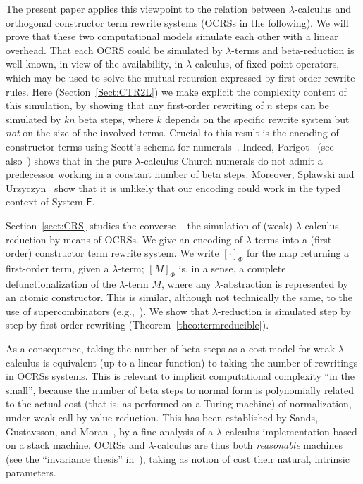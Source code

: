 \documentclass{LMCS}
\newcommand{\LambdatoTRS}[1]{[#1]_{\Phi}}
\newcounter{number}
\begin{document}
The present paper applies this viewpoint to the relation between $\lambda$-calculus and orthogonal constructor 
term rewrite systems (OCRSs in the following). We will prove that these two computational
models simulate each other with a linear overhead. That each OCRS
could be simulated by $\lambda$-terms and beta-reduction is
well known, in view of the availability, in $\lambda$-calculus, of
fixed-point operators, which may be used to solve the mutual recursion expressed by 
first-order rewrite rules. 
Here (Section~\ref{Sect:CTR2L})
we make explicit the complexity content of this simulation, by showing that
any first-order rewriting of $n$ steps can be simulated by $kn$ beta steps, where
$k$ depends on the specific rewrite system but \emph{not} on the size of the involved terms.
Crucial to this result is the encoding of constructor terms using Scott's schema for numerals~\cite{Wadsworth80}.
Indeed, Parigot~\cite{Parigot89CSL} (see also~\cite{ParigotRoziere93}) shows that in the pure $\lambda$-calculus
Church numerals do not admit a predecessor working in a constant number of beta steps.
Moreover, Splawski and Urzyczyn~\cite{SplawskiU99} show that it is unlikely that our encoding 
could work in the typed context of System $\mathsf{F}$.

Section~\ref{sect:CRS} studies the converse -- the simulation of (weak) $\lambda$-calculus reduction by means of
OCRSs. We give an encoding of $\lambda$-terms into a (first-order) constructor term rewrite 
system. We write   $\LambdatoTRS{\cdot}$ for the map returning a first-order term, given a $\lambda$-term; 
$\LambdatoTRS{M}$ is, in a sense, a complete defunctionalization of the $\lambda$-term $M$, 
where any $\lambda$-abstraction is represented by an atomic constructor. This is similar, 
although not technically the same, to the use of supercombinators (e.g.,~\cite{PJ87}).
We show that $\lambda$-reduction is simulated step by step by first-order rewriting 
(Theorem~\ref{theo:termreducible}).

As a consequence, taking the number of beta steps as a cost model for weak $\lambda$-calculus
is equivalent (up to a linear function) to taking the number of rewritings in OCRSs
systems. This is relevant to implicit computational complexity ``in the small'', because
the number of beta steps to normal form is polynomially related to the
actual cost (that is, as performed on a Turing machine) of normalization,
under weak call-by-value reduction. This has been established by 
Sands, Gustavsson, and Moran~\cite{Sands:Lambda02}, by a fine analysis of a $\lambda$-calculus implementation based on
a stack machine. OCRSs and $\lambda$-calculus
are thus both \emph{reasonable} machines (see the ``invariance thesis'' in~\cite{vanEmdeBoas90}),
taking as notion of cost their natural, intrinsic parameters.
\end{document}
